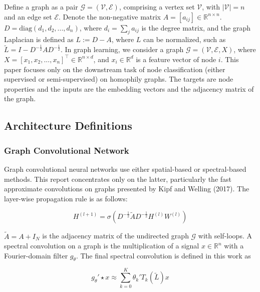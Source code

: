 \documentclass[11pt]{article}
\begin{document}
Define a graph as a pair $\mathcal{G}=(\mathcal{V}, \mathcal{E})$, comprising a vertex set $\mathcal{V}$, with $|\mathcal{V}|=n$ and an edge set $\mathcal{E}$. Denote the non-negative matrix $A=[a_{ij}] \in \mathbb{R}^{n \times n}$. $D=\text{diag}(d_1,d_2,...,d_n)$, where $d_i=\sum_j a_{ij}$ is the degree matrix, and the graph Laplacian is defined as $L := D-A$, where $L$ can be normalized, such as $\tilde{L}=I-D^{-\frac{1}{2}}AD^{-\frac{1}{2}}$. In graph learning, we consider a graph $\mathcal{G}=(\mathcal{V}, \mathcal{E}, X)$, where $X=[x_1,x_2,...,x_n]^\top \in \mathbb{R}^{n \times d}$, and $x_i \in \mathbb{R}^d$ is a feature vector of node $i$. This paper focuses only on the downstream task of node classification (either supervised or semi-supervised) on homophily graphs. The targets are node properties and the inputs are the embedding vectors and the adjacency matrix of the graph. 

\subsection{Architecture Definitions}

\subsubsection{Graph Convolutional Network}

Graph convolutional neural networks use either spatial-based \cite{https://doi.org/10.48550/arxiv.1909.05310} or spectral-based \cite{https://doi.org/10.48550/arxiv.1609.02907} methods. This report concentrates only on the latter, particularly the fast approximate convolutions on graphs presented by Kipf and Welling (2017). The layer-wise propagation rule is as follows:

\begin{equation}
    H^{(l + 1)} = \sigma \left(D^{-\frac{1}{2}}\tilde{A}D^{-\frac{1}{2}}H^{(l)}W^{(l)} \right)
\end{equation}

$\tilde{A} = A + I_N$ is the adjacency matrix of the undirected graph $\mathcal{G}$ with self-loops. A spectral convolution on a graph is the multiplication of a signal $x \in \mathbb{R}^n$ with a Fourier-domain filter $g_\theta$. The final spectral convolution is defined in this work as

\begin{equation}
    g_\theta' \star x \approx \sum_{k=0}^{K} \theta_k'T_k(\tilde{L})x
\end{equation}
\end{document}
